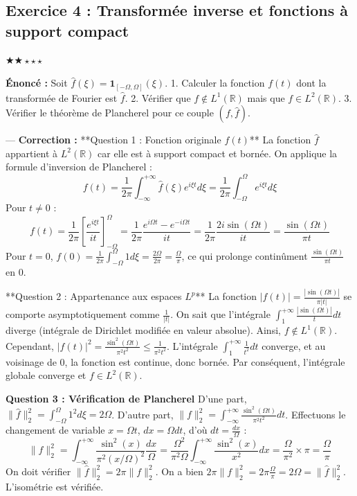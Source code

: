 \documentclass[11pt,a4paper]{article}
\begin{document}
\subsection*{Exercice 4 : Transformée inverse et fonctions à support compact}
$\bigstar\bigstar\star\star\star$

\textbf{Énoncé :}
Soit $\hat{f}(\xi) = \mathbf{1}_{[-\Omega, \Omega]}(\xi)$.
1. Calculer la fonction $f(t)$ dont la transformée de Fourier est $\hat{f}$.
2. Vérifier que $f \notin L^1(\mathbb{R})$ mais que $f \in L^2(\mathbb{R})$.
3. Vérifier le théorème de Plancherel pour ce couple $(f, \hat{f})$.

---
\textbf{Correction :}
**Question 1 : Fonction originale $f(t)$**
La fonction $\hat{f}$ appartient à $L^2(\mathbb{R})$ car elle est à support compact et bornée. On applique la formule d'inversion de Plancherel :
$$ f(t) = \frac{1}{2\pi} \int_{-\infty}^{+\infty} \hat{f}(\xi) e^{i\xi t} d\xi = \frac{1}{2\pi} \int_{-\Omega}^{\Omega} e^{i\xi t} d\xi $$
Pour $t \neq 0$ :
$$ f(t) = \frac{1}{2\pi} \left[ \frac{e^{i\xi t}}{it} \right]_{-\Omega}^{\Omega} = \frac{1}{2\pi} \frac{e^{i\Omega t} - e^{-i\Omega t}}{it} = \frac{1}{2\pi} \frac{2i\sin(\Omega t)}{it} = \frac{\sin(\Omega t)}{\pi t} $$
Pour $t = 0$, $f(0) = \frac{1}{2\pi} \int_{-\Omega}^{\Omega} 1 d\xi = \frac{2\Omega}{2\pi} = \frac{\Omega}{\pi}$, ce qui prolonge continûment $\frac{\sin(\Omega t)}{\pi t}$ en $0$.

**Question 2 : Appartenance aux espaces $L^p$**
La fonction $|f(t)| = \frac{|\sin(\Omega t)|}{\pi |t|}$ se comporte asymptotiquement comme $\frac{1}{|t|}$.
On sait que l'intégrale $\int_{1}^{+\infty} \frac{|\sin(\Omega t)|}{t} dt$ diverge (intégrale de Dirichlet modifiée en valeur absolue). Ainsi, $f \notin L^1(\mathbb{R})$.
Cependant, $|f(t)|^2 = \frac{\sin^2(\Omega t)}{\pi^2 t^2} \le \frac{1}{\pi^2 t^2}$. L'intégrale $\int_{1}^{+\infty} \frac{1}{t^2} dt$ converge, et au voisinage de 0, la fonction est continue, donc bornée. Par conséquent, l'intégrale globale converge et $f \in L^2(\mathbb{R})$.

\textbf{Question 3 : Vérification de Plancherel}
D'une part, $\|\hat{f}\|_2^2 = \int_{-\Omega}^{\Omega} 1^2 d\xi = 2\Omega$.
D'autre part, $\|f\|_2^2 = \int_{-\infty}^{+\infty} \frac{\sin^2(\Omega t)}{\pi^2 t^2} dt$.
Effectuons le changement de variable $x = \Omega t$, $dx = \Omega dt$, d'où $dt = \frac{dx}{\Omega}$ :
$$ \|f\|_2^2 = \int_{-\infty}^{+\infty} \frac{\sin^2(x)}{\pi^2 (x/\Omega)^2} \frac{dx}{\Omega} = \frac{\Omega^2}{\pi^2 \Omega} \int_{-\infty}^{+\infty} \frac{\sin^2(x)}{x^2} dx = \frac{\Omega}{\pi^2} \times \pi = \frac{\Omega}{\pi} $$
On doit vérifier $\|\hat{f}\|_2^2 = 2\pi \|f\|_2^2$.
On a bien $2\pi \|f\|_2^2 = 2\pi \frac{\Omega}{\pi} = 2\Omega = \|\hat{f}\|_2^2$. L'isométrie est vérifiée.
\end{document}
